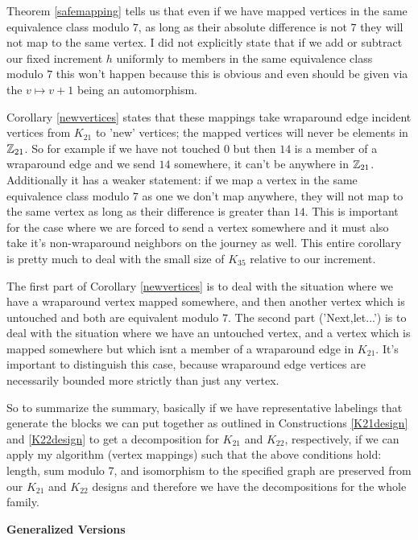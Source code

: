 Theorem \ref{safemapping} tells us that even if we have mapped vertices in the same equivalence class modulo $7$, as long as their absolute difference is not $7$ they will not map to the same vertex. I did not explicitly state that if we add or subtract our fixed increment $h$ uniformly to members in the same equivalence class modulo $7$ this won't happen because this is obvious and even should be given via the $v\mapsto v+1$ being an automorphism.  

Corollary \ref{newvertices} states that these mappings take wraparound edge incident vertices from $K_{21}$ to 'new' vertices; the mapped vertices will never be elements in $\mathbb{Z}_{21}$. So for example if we have not touched $0$ but then $14$ is a member of a wraparound edge and we send $14$ somewhere, it can't be anywhere in $\mathbb{Z}_{21}$. Additionally it has a weaker statement: if we map a vertex in the same equivalence class modulo $7$ as one we don't map anywhere, they will not map to the same vertex as long as their difference is greater than $14$. This is important for the case where we are forced to send a vertex somewhere and it must also take it's non-wraparound neighbors on the journey as well. This entire corollary is pretty much to deal with the small size of $K_{35}$ relative to our increment. 

The first part of Corollary \ref{newvertices} is to deal with the situation where we have a wraparound vertex mapped somewhere, and then another vertex which is untouched and both are equivalent modulo $7$. The second part ('Next,let...') is to deal with the situation where we have an untouched vertex, and a vertex which is mapped somewhere but which isnt a member of a wraparound edge in $K_{21}$. It's important to distinguish this case, because wraparound edge vertices are necessarily bounded more strictly than just any vertex.

So to summarize the summary, basically if we have representative labelings that generate the blocks we can put together as outlined in Constructions \ref{K21design} and \ref{K22design} to get a decomposition for $K_{21}$ and $K_{22}$, respectively, if we can apply my algorithm (vertex mappings) such that the above conditions hold: length, sum modulo $7$, and isomorphism to the specified graph are preserved from our $K_{21}$ and $K_{22}$ designs and therefore we have the decompositions for the whole family.
\newpage

\begin{center}
\textbf{Generalized Versions}
\end{center}
